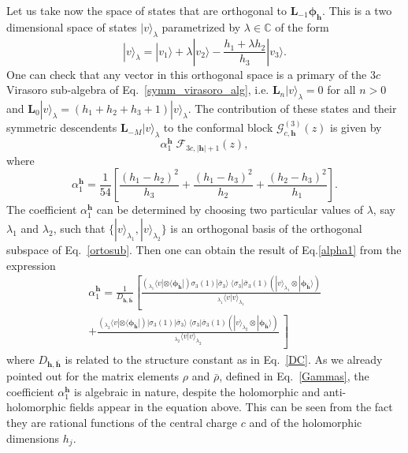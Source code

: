 \documentclass[a4paper,11pt]{article}
\begin{document}
Let us take now the space of states that are orthogonal to $\boldsymbol{L}_{-1}\boldsymbol{\phi}_{\boldsymbol{h}}$. This is a two dimensional space of states $|v\rangle_{\lambda}$ parametrized by $\lambda \in \mathbb{C}$ of the form
\begin{equation}
\label{ortosub}
 |v\rangle_{\lambda}= |v_1\rangle+\lambda |v_2\rangle
 -\frac{h_1+\lambda h_2}{h_3} |v_3\rangle.
\end{equation}
One can check
that any vector in this orthogonal space is a primary of the $3 c$ Virasoro sub-algebra of 
Eq.~\eqref{symm_virasoro_alg}, i.e. $\boldsymbol{L}_n  |v\rangle_{\lambda}=0$ for all $n>0$
and $\boldsymbol{L}_0|v\rangle_{\lambda} = (h_1+h_2+h_3+1)|v\rangle_{\lambda}$.
The contribution of these states and their symmetric descendents $\boldsymbol{L}_{-M}|v\rangle_{\lambda}$ 
to the conformal block $\mathcal{G}_{c, \boldsymbol{h}}^{(3)}(z)$ is given by
\begin{equation}
\alpha_{1}^{\boldsymbol{h}}\;\mathcal{F}_{3c, |\boldsymbol{h}|+1}(z),
\end{equation}
where 
\begin{equation}
\label{alpha1}
\alpha_{1}^{\boldsymbol{h}} =\frac{1}{54}\left[\frac{(h_1-h_2)^2}{h_3}+\frac{(h_1-h_3)^2}{h_2}+\frac{(h_2-h_3)^2}{h_1}\right].
\end{equation}
The coefficient $\alpha_{1}^{\boldsymbol{h}}$ can  be determined by choosing two particular values of $\lambda$, say $\lambda_1$ and $\lambda_2$, such that $\{|v\rangle_{\lambda_1}, |v\rangle_{\lambda_2}\}$ is an orthogonal basis of the orthogonal subspace of Eq.~\eqref{ortosub}. Then one can obtain the result of Eq.\eqref{alpha1} from the expression
\begin{multline}
 \alpha_1^{\boldsymbol{h}}=\frac{1}{D_{\boldsymbol{h},\boldsymbol{\bar{h}}}}
 \left[\frac{(_{\lambda_1}\langle v |\otimes \langle \boldsymbol{\phi}_{\boldsymbol{\bar{h}}}|)\sigma_{3}(1)|\bar{\sigma}_3\rangle \;\langle \sigma_{3}|\bar{\sigma}_3(1) (|v\rangle_{\lambda_1}\otimes |\boldsymbol{\phi}_{\boldsymbol{\bar{h}}}\rangle)}{_{\lambda_1}\langle v|v\rangle_{\lambda_1}}  \right.\\ 
 +\left.
 \frac{( _{\lambda_2}\langle v| \otimes \langle \boldsymbol{\phi}_{\boldsymbol{\bar{h}}}|)|\sigma_{3}(1)|\bar{\sigma}_3\rangle \;\langle \sigma_{3}|\bar{\sigma}_3(1)(|v\rangle_{\lambda_2}\otimes |\boldsymbol{\phi}_{\boldsymbol{\bar{h}}}\rangle)}{_{\lambda_2}\langle v|v\rangle_{\lambda_2}}\  \right]
\end{multline}
where $D_{\boldsymbol{h},\boldsymbol{\bar{h}}}$ is related to the structure constant as in Eq.~\eqref{DC}. As we already pointed out for the matrix elements $\rho$ and $\bar{\rho}$, defined in Eq.~\eqref{Gammas}, the coefficient $\alpha^{\boldsymbol{h}}_1$  is algebraic in nature, despite the holomorphic and anti-holomorphic fields appear in the equation above. This can be seen from the fact they are rational functions of the central charge $c$ and of the holomorphic dimensions $h_j$.
\end{document}
